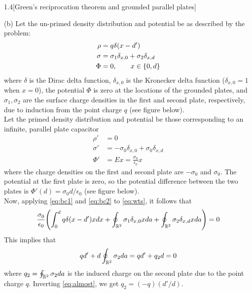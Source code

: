 \documentclass[12pt]{article}
\begin{document}
\begin{problem}{1.4}[Green's reciprocation theorem and grounded
    parallel plates]
\begin{solution}
    (b) Let the un-primed density distribution and potential be as described by
    the problem:
    \begin{subequations}\label{eq:bc1}
        \begin{align}
            \rho&=q\delta(x-d')\\
            \sigma&=\sigma_1\delta_{x,0}+\sigma_2\delta_{x,d}\\
            \Phi&=0,\qquad x\in\qty{0,d}
        \end{align} 
    \end{subequations}
    where $\delta$ is the Dirac delta function, $\delta_{x,0}$ is the
    Kronecker delta function ($\delta_{x,0}=1$ when $x=0$), the potential 
    $\Phi$ is zero at the locations of the grounded plates, and
    $\sigma_1,\sigma_2$ are the surface charge densities in the first and 
    second plate, respectively, due to induction from the point charge $q$ (see 
    figure below).\\[2in]

    Let the primed density distribution and potential be those corresponding to 
    an infinite, parallel plate capacitor
    \begin{subequations}\label{eq:bc2}
        \begin{align}
            \rho'&=0\\
            \sigma'&=-\sigma_0\delta_{x,0}+\sigma_0\delta_{x,d}\\
            \Phi'&=Ex=\frac{\sigma_0}{\epsilon_0}x
        \end{align} 
    \end{subequations}
    where the charge densities on the first and second plate are $-\sigma_0$ and
    $\sigma_0$. The potential at the first plate is zero, so the potential
    difference between the two plates is $\Phi'(d)=\sigma_0
    d/\epsilon_0$ (see figure below).\\[2in]

    Now, applying \eqref{eq:bc1} and \eqref{eq:bc2} to \eqref{eq:wts}, it 
    follows that
    \begin{equation}
        \frac{\sigma_0}{\epsilon_0}\qty(\int_0^d q\delta(x-d')xdx
        +\oint_{\mathbb{R}^2}\sigma_1\delta_{x,0}x da
        +\oint_{\mathbb{R}^2}\sigma_2\delta_{x,d}xda)=0
    \end{equation}
    This implies that
    \begin{equation}\label{eq:almost}
        qd'+d\oint_{\mathbb{R}^2}\sigma_2da=qd'+q_2d=0
    \end{equation}
    where $q_2=\oint_{\mathbb{R}^2}\sigma_2da$ is the induced charge on the
    second plate due to the point charge $q$. Inverting \eqref{eq:almost}, we 
    get $q_2=(-q)(d'/d)$.
\end{solution}
    
\end{problem}
\end{document}
